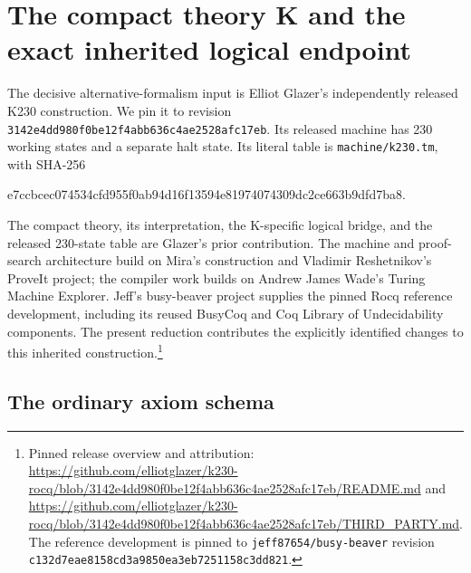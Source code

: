 \section{The compact theory K and the exact inherited logical endpoint}
\label{sec:k230-calibration}

The decisive alternative-formalism input is Elliot Glazer's independently
released K230 construction.  We pin it to revision
\texttt{3142e4dd980f0be12f4abb636c4ae2528afc17eb}.  Its released machine has
230 working states and a separate halt state.  Its literal table is
\texttt{machine/k230.tm}, with SHA-256
\begin{center}\scriptsize\ttfamily
e7ccbcec074534cfd955f0ab94d16f13594e81974074309dc2ce663b9dfd7ba8.
\end{center}
The compact theory, its interpretation, the K-specific logical bridge,
and the released 230-state table are Glazer's prior contribution.
The machine and proof-search architecture build on Mira's construction
and Vladimir Reshetnikov's ProveIt project; the compiler work builds on
Andrew James Wade's Turing Machine Explorer.  Jeff's busy-beaver project
supplies the pinned Rocq reference development, including its reused
BusyCoq and Coq Library of Undecidability components.  The present
reduction contributes the explicitly identified changes to this inherited
construction.\footnote{Pinned release overview and attribution:
\url{https://github.com/elliotglazer/k230-rocq/blob/3142e4dd980f0be12f4abb636c4ae2528afc17eb/README.md}
and
\url{https://github.com/elliotglazer/k230-rocq/blob/3142e4dd980f0be12f4abb636c4ae2528afc17eb/THIRD_PARTY.md}.
The reference development is pinned to
\texttt{jeff87654/busy-beaver} revision
\texttt{c132d7eae8158cd3a9850ea3eb7251158c3dd821}.}

\subsection{The ordinary axiom schema}

